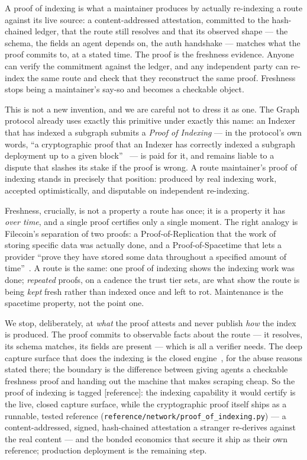\documentclass[11pt]{article}
\newcommand{\refimpl}{\textcolor{blue!70!black}{\small[reference]}}
\begin{document}
A proof of indexing is what a maintainer produces by actually re-indexing a route
against its live source: a content-addressed attestation, committed to the
hash-chained ledger, that the route still resolves and that its observed shape ---
the schema, the fields an agent depends on, the auth handshake --- matches what the
proof commits to, at a stated time. The proof is the freshness evidence. Anyone can
verify the commitment against the ledger, and any independent party can re-index the
same route and check that they reconstruct the same proof. Freshness stops being a
maintainer's say-so and becomes a checkable object.

This is not a new invention, and we are careful not to dress it as one. The Graph
protocol already uses exactly this primitive under exactly this name: an Indexer
that has indexed a subgraph submits a \emph{Proof of Indexing} --- in the protocol's
own words, ``a cryptographic proof that an Indexer has correctly indexed a subgraph
deployment up to a given block''~\cite{thegraph} --- is paid for it, and remains
liable to a dispute that slashes its stake if the proof is wrong. A route
maintainer's proof of indexing stands in precisely that position: produced by real
indexing work, accepted optimistically, and disputable on independent re-indexing.

Freshness, crucially, is not a property a route has once; it is a property it has
\emph{over time}, and a single proof certifies only a single moment. The right
analogy is Filecoin's separation of two proofs: a Proof-of-Replication that the work
of storing specific data was actually done, and a Proof-of-Spacetime that lets a
provider ``prove they have stored some data throughout a specified amount of
time''~\cite{filecoin2017}. A route is the same: one proof of indexing shows the
indexing work was done; \emph{repeated} proofs, on a cadence the trust tier sets,
are what show the route is being \emph{kept} fresh rather than indexed once and left
to rot. Maintenance is the spacetime property, not the point one.

We stop, deliberately, at \emph{what} the proof attests and never publish \emph{how}
the index is produced. The proof commits to observable facts about the route --- it
resolves, its schema matches, its fields are present --- which is all a verifier
needs. The deep capture surface that does the indexing is the closed
engine~\cite{ossnotice}, for the abuse reasons stated there; the boundary is the
difference between giving agents a checkable freshness proof and handing out the
machine that makes scraping cheap. So the proof of indexing is tagged \refimpl{}:
the indexing capability it would certify is the live, closed capture surface, while
the cryptographic proof itself ships as a runnable, tested reference
(\texttt{reference/network/proof\_of\_indexing.py}) --- a content-addressed, signed,
hash-chained attestation a stranger re-derives against the real content --- and the
bonded economics that secure it ship as their own reference; production deployment
is the remaining step.
\end{document}
